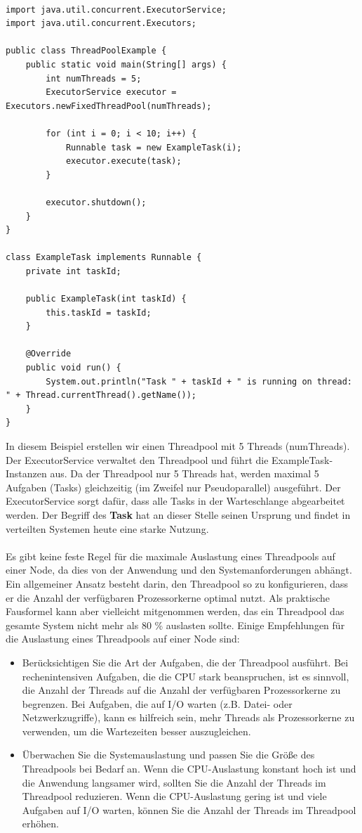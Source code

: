 \documentclass[../vs-script-first-v01.tex]{subfiles}
\begin{document}
\begin{lstlisting}[caption={ExecutorService-Klasse},captionpos=b,label={lst:executor}]

import java.util.concurrent.ExecutorService;
import java.util.concurrent.Executors;

public class ThreadPoolExample {
    public static void main(String[] args) {
        int numThreads = 5;
        ExecutorService executor = Executors.newFixedThreadPool(numThreads);

        for (int i = 0; i < 10; i++) {
            Runnable task = new ExampleTask(i);
            executor.execute(task);
        }

        executor.shutdown();
    }
}

class ExampleTask implements Runnable {
    private int taskId;

    public ExampleTask(int taskId) {
        this.taskId = taskId;
    }

    @Override
    public void run() {
        System.out.println("Task " + taskId + " is running on thread: " + Thread.currentThread().getName());
    }
}
\end{lstlisting}
In diesem Beispiel erstellen wir einen Threadpool mit 5 Threads (numThreads). Der ExecutorService verwaltet den Threadpool und führt die ExampleTask-Instanzen aus. Da der Threadpool nur 5 Threads hat, werden maximal 5 Aufgaben (Tasks) gleichzeitig (im Zweifel nur Pseudoparallel) ausgeführt. Der ExecutorService sorgt dafür, dass alle Tasks in der Warteschlange abgearbeitet werden. Der Begriff des \textbf{Task} hat an dieser Stelle seinen Ursprung und findet in verteilten Systemen heute eine starke Nutzung.\\\\


Es gibt keine feste Regel für die maximale Auslastung eines Threadpools auf einer Node, da dies von der Anwendung und den Systemanforderungen abhängt. Ein allgemeiner Ansatz besteht darin, den Threadpool so zu konfigurieren, dass er die Anzahl der verfügbaren Prozessorkerne optimal nutzt. Als praktische Fausformel kann aber vielleicht mitgenommen werden, das ein Threadpool das gesamte System nicht mehr als 80 \% auslasten sollte.
Einige Empfehlungen für die Auslastung eines Threadpools auf einer Node sind:
\begin{itemize}
\item Berücksichtigen Sie die Art der Aufgaben, die der Threadpool ausführt. Bei rechenintensiven Aufgaben, die die CPU stark beanspruchen, ist es sinnvoll, die Anzahl der Threads auf die Anzahl der verfügbaren Prozessorkerne zu begrenzen. Bei Aufgaben, die auf I/O warten (z.B. Datei- oder Netzwerkzugriffe), kann es hilfreich sein, mehr Threads als Prozessorkerne zu verwenden, um die Wartezeiten besser auszugleichen.
\item Überwachen Sie die Systemauslastung und passen Sie die Größe des Threadpools bei Bedarf an. Wenn die CPU-Auslastung konstant hoch ist und die Anwendung langsamer wird, sollten Sie die Anzahl der Threads im Threadpool reduzieren. Wenn die CPU-Auslastung gering ist und viele Aufgaben auf I/O warten, können Sie die Anzahl der Threads im Threadpool erhöhen.
\end{itemize}
\end{document}
